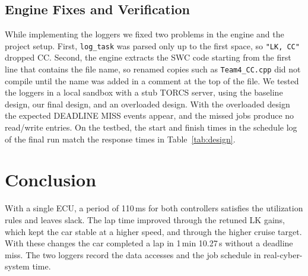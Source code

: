 \documentclass[11pt,a4paper]{article}
\begin{document}
\subsection{Engine Fixes and Verification}
While implementing the loggers we fixed two problems in the engine and the project setup. First,
\texttt{log\_task} was parsed only up to the first space, so \texttt{"LK, CC"} dropped CC. Second, the
engine extracts
the SWC code starting from the first line that contains the file name, so renamed copies such as
\texttt{Team4\_CC.cpp} did not compile until the name was added in a comment at the top of the file.
We tested the loggers in a local sandbox with a stub TORCS server, using the baseline design, our
final design, and an overloaded design. With the overloaded design the expected DEADLINE MISS events
appear, and the missed jobs produce no read/write entries. On the testbed, the start and finish times in
the schedule log of the final run match the response times in Table~\ref{tab:design}.

\section{Conclusion}
With a single ECU, a period of 110\,ms for both controllers satisfies the utilization rules and
leaves slack. The lap time improved through the retuned LK gains, which kept the car stable at a
higher speed, and through the higher cruise target. With these changes the car completed a lap in
1\,min 10.27\,s without a deadline miss. The two loggers record the data accesses and the job
schedule in real-cyber-system time.



\end{document}
